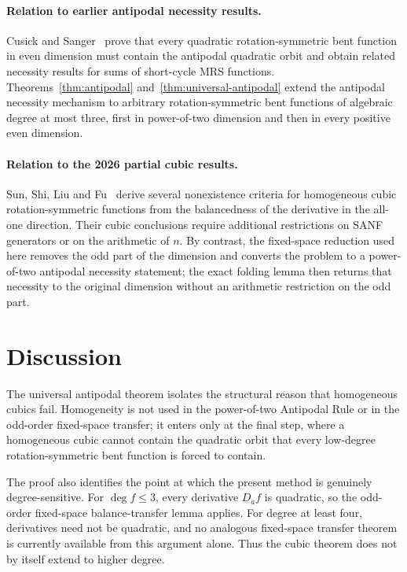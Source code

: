 \documentclass[11pt,a4paper]{article}
\begin{document}
\paragraph{Relation to earlier antipodal necessity results.}
Cusick and Sanger~\cite{cusick} prove that every quadratic rotation-symmetric bent function in even dimension must contain the antipodal quadratic orbit and obtain related necessity results for sums of short-cycle MRS functions. Theorems~\ref{thm:antipodal} and~\ref{thm:universal-antipodal} extend the antipodal necessity mechanism to arbitrary rotation-symmetric bent functions of algebraic degree at most three, first in power-of-two dimension and then in every positive even dimension.

\paragraph{Relation to the 2026 partial cubic results.}
Sun, Shi, Liu and Fu~\cite{sun} derive several nonexistence criteria for homogeneous cubic rotation-symmetric functions from the balancedness of the derivative in the all-one direction. Their cubic conclusions require additional restrictions on SANF generators or on the arithmetic of $n$. By contrast, the fixed-space reduction used here removes the odd part of the dimension and converts the problem to a power-of-two antipodal necessity statement; the exact folding lemma then returns that necessity to the original dimension without an arithmetic restriction on the odd part.

\section{Discussion}
The universal antipodal theorem isolates the structural reason that homogeneous cubics fail. Homogeneity is not used in the power-of-two Antipodal Rule or in the odd-order fixed-space transfer; it enters only at the final step, where a homogeneous cubic cannot contain the quadratic orbit that every low-degree rotation-symmetric bent function is forced to contain.

The proof also identifies the point at which the present method is genuinely degree-sensitive. For $\deg f\le3$, every derivative $D_af$ is quadratic, so the odd-order fixed-space balance-transfer lemma applies. For degree at least four, derivatives need not be quadratic, and no analogous fixed-space transfer theorem is currently available from this argument alone. Thus the cubic theorem does not by itself extend to higher degree.
\end{document}
